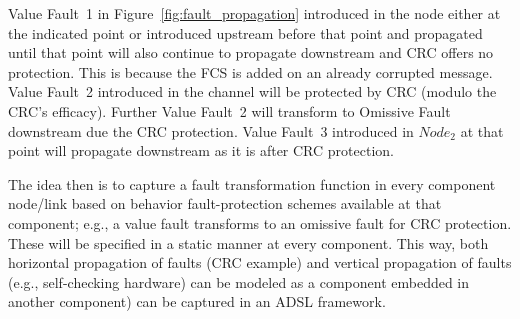 Value Fault~1 in Figure~\ref{fig:fault_propagation} introduced in the node
either at the indicated point or introduced upstream before that point and
propagated until that point will also continue to propagate downstream and
CRC
offers no protection. This is because the FCS is added on an already corrupted
message. Value Fault~2 introduced in the channel will be protected by CRC
(modulo the CRC's efficacy). Further Value Fault~2 will transform to Omissive Fault downstream due the CRC protection. 
Value Fault~3 introduced in $Node_2$ at that
point will propagate downstream as it is after CRC protection.

The idea then is to capture a fault transformation function in every
component
node/link based on behavior fault-protection schemes available at that component;
e.g., a value fault transforms to an omissive fault for CRC protection. 
These will be
specified in a static manner at every component. This way, both horizontal
propagation of faults (CRC example) and vertical propagation of faults
(e.g., self-checking hardware) can be modeled as a component embedded
in another
component) can be captured in an ADSL framework.


